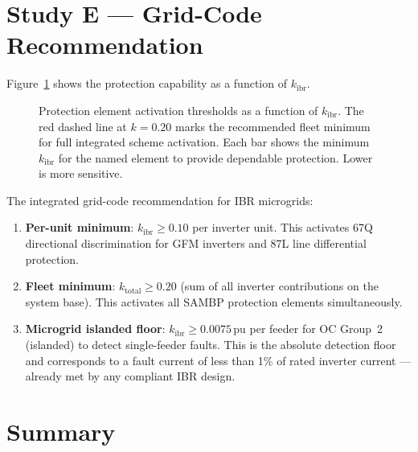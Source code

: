 \documentclass[11pt,a4paper]{article}
\begin{document}
\section{Study E --- Grid-Code Recommendation}
\label{sec:studyE}

Figure~\ref{fig:gridcode} shows the protection capability as a function of
$k_\mathrm{ibr}$.

\begin{figure}[htbp]
  \centering
  \resizebox{0.88\textwidth}{!}{}
  \caption{Protection element activation thresholds as a function of
           $k_\mathrm{ibr}$.  The red dashed line at $k=0.20$ marks the
           recommended fleet minimum for full integrated scheme activation.
           Each bar shows the minimum $k_\mathrm{ibr}$ for the named element
           to provide dependable protection.  Lower is more sensitive.}
  \label{fig:gridcode}
\end{figure}

\noindent
The integrated grid-code recommendation for IBR microgrids:

\begin{enumerate}
  \item \textbf{Per-unit minimum}: $k_\mathrm{ibr}\geq0.10$ per inverter unit.
    This activates 67Q directional discrimination for GFM inverters and 87L
    line differential protection.

  \item \textbf{Fleet minimum}: $k_\mathrm{total}\geq0.20$ (sum of all inverter
    contributions on the system base).  This activates all SAMBP protection
    elements simultaneously.

  \item \textbf{Microgrid islanded floor}: $k_\mathrm{ibr}\geq0.0075$\,pu per
    feeder for OC Group~2 (islanded) to detect single-feeder faults.  This is
    the absolute detection floor and corresponds to a fault current of less than
    1\% of rated inverter current --- already met by any compliant IBR design.
\end{enumerate}

\section{Summary}
\label{sec:summary}
\end{document}
